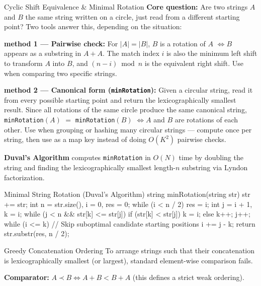\documentclass[10pt]{article}
\newcommand{\complexity}[1]{%
  \tcbox[on line,
    colback=tagbg,
    colframe=tagbg,
    boxrule=0pt,
    arc=2pt,
    boxsep=0pt,
    left=3.5pt, right=3.5pt, top=1.5pt, bottom=1.5pt
  ]{\color{tagtext}\scriptsize\bfseries\ensuremath{#1}}%
}
\begin{document}
\newpage
\begin{conceptbox}{Cyclic Shift Equivalence \& Minimal Rotation}
    \textbf{Core question:} Are two strings $A$ and $B$ the same string written on a circle, just read from a different starting point? Two tools answer this, depending on the situation:
    \begin{resultbox}
        \textbf{method 1 --- Pairwise check:} For $|A| = |B|$, $B$ is a rotation of $A$ $\iff B$ appears as a substring in $A + A$. The match index $i$ is also the minimum left shift to transform $A$ into $B$, and $(n - i) \bmod n$ is the equivalent right shift. Use when comparing two specific strings.
    \end{resultbox}
    \begin{resultbox}
        \textbf{method 2 --- Canonical form (\texttt{minRotation}):} Given a circular string, read it from every possible starting point and return the lexicographically smallest result. Since all rotations of the same circle produce the same canonical string, \texttt{minRotation}$(A)$ $=$ \texttt{minRotation}$(B)$ $\iff A$ and $B$ are rotations of each other. Use when grouping or hashing many circular strings --- compute once per string, then use as a map key instead of doing $O(K^2)$ pairwise checks.
    \end{resultbox}
    \textbf{Duval's Algorithm} computes \texttt{minRotation} in $O(N)$ time by doubling the string and finding the lexicographically smallest length-$n$ substring via Lyndon factorization.
\end{conceptbox}

\begin{vscode}{Minimal String Rotation (Duval's Algorithm) \complexity{O(N)}}
string minRotation(string str)
{
    str += str;
    int n = str.size(), i = 0, res = 0;
    while (i < n / 2)
    {
        res = i;
        int j = i + 1, k = i;
        while (j < n && str[k] <= str[j])
        {
            if (str[k] < str[j])
                k = i;
            else
                k++;
            j++;
        }
        while (i <= k) // Skip suboptimal candidate starting positions
            i += j - k;
    }
    return str.substr(res, n / 2);
}
\end{vscode}

\begin{conceptbox}{Greedy Concatenation Ordering}
    To arrange strings such that their concatenation is lexicographically smallest (or largest), standard element-wise comparison fails.
    \begin{resultbox}
        \textbf{Comparator:} $A \prec B \iff A + B < B + A$ (this defines a strict weak ordering).
    \end{resultbox}
\end{conceptbox}
\end{document}
